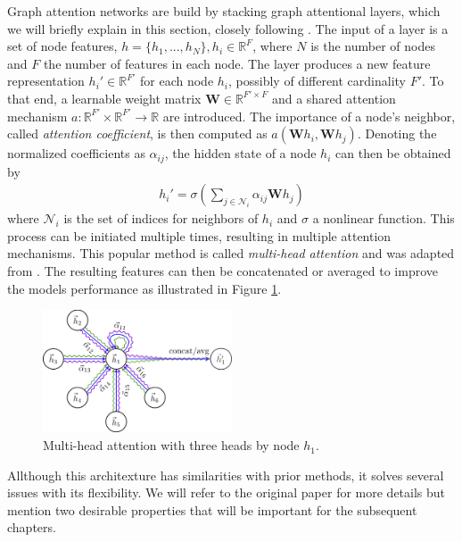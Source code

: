 \label{chapter:GAT Architecture}

Graph attention networks are build by stacking graph attentional layers, which we will briefly explain in this section, closely following \cite{velickovic2018graph}. The input of a layer is a set of node features, $h = \{h_1,...,h_N\}, h_i \in \mathbb{R}^F$, where $N$ is the number of nodes and $F$ the number of features in each node. The layer produces a new feature representation $h_i' \in \mathbb{R}^{F'}$ for each node $h_i$, possibly of different cardinality $F'$. To that end, a learnable weight matrix $\mathbf{W} \in \mathbb{R}^{F' \times F}$ and a shared attention mechanism $a: \mathbb{R}^{F'} \times \mathbb{R}^{F'} \rightarrow \mathbb{R}$ are introduced. The importance of a node's neighbor, called \textit{attention coefficient}, is then computed as $a(\mathbf{W}h_i, \mathbf{W}h_j)$. Denoting the normalized coefficients as $\alpha_{ij}$, the hidden state of a node $h_i$ can then be obtained by
\begin{align*}
    h_i' = \sigma(\sum_{j \in \mathcal{N}_i} \alpha_{ij}\mathbf{W}h_j)
\end{align*}
where $\mathcal{N}_i$ is the set of indices for neighbors of $h_i$ and $\sigma$ a nonlinear function. This process can be initiated multiple times, resulting in multiple attention mechanisms. This popular method is called \textit{multi-head attention} and was adapted from \cite{vaswani2017attention}. The resulting features can then be concatenated or averaged to improve the models performance  as illustrated in Figure \ref{fig:multi-head}.\\
\begin{figure}[h]
    \centering
    \includegraphics[width=0.5\textwidth]{img/multi_head.png}
    \caption{Multi-head attention with three heads by node $h_1$. \cite{velickovic2018graph}}
    \label{fig:multi-head}
\end{figure}

Allthough this architexture has similarities with prior methods, it solves several issues with its flexibility. We will refer to the original paper for more details but mention two desirable properties that will be important for the subsequent chapters. 

